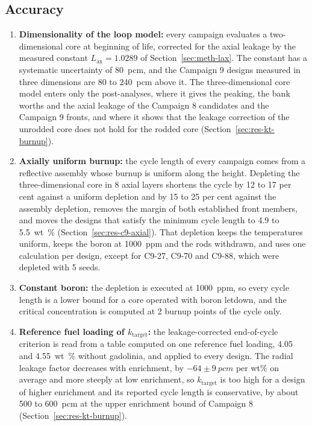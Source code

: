 \subsection{Accuracy}
\label{sec:res-uncertainty-accuracy}

\begin{enumerate}
  \item \textbf{Dimensionality of the loop model:} every campaign
        evaluates a two-dimensional core at beginning of life,
        corrected for the axial leakage by the measured constant
        $L_\mathrm{ax} = 1.0289$ of Section~\ref{sec:meth-lax}. The
        constant has a systematic uncertainty of \SI{80}{pcm}, and the
        Campaign 9 designs measured in three dimensions are 80 to
        \SI{240}{pcm} above it. The three-dimensional core model
        enters only the post-analyses, where it gives the peaking, the
        bank worths and the axial leakage of the Campaign 8 candidates
        and the Campaign 9 fronts, and where it shows that the leakage
        correction of the unrodded core does not hold for the rodded
        core (Section~\ref{sec:res-kt-burnup}).

  \item \textbf{Axially uniform burnup:} the cycle length of every
        campaign comes from a reflective assembly whose burnup is
        uniform along the height. Depleting the three-dimensional core
        in 8 axial layers shortens the cycle by 12 to 17 per cent
        against a uniform depletion and by 15 to 25 per cent against
        the assembly depletion, removes the margin of both established
        front members, and moves the designs that satisfy the minimum
        cycle length to 4.9 to \SI{5.5}{wt\%}
        (Section~\ref{sec:res-c9-axial}). That depletion keeps the
        temperatures uniform, keeps the boron at \SI{1000}{ppm} and the
        rods withdrawn, and uses one calculation per design, except for
        C9-27, C9-70 and C9-88, which were depleted with 5 seeds.

  \item \textbf{Constant boron:} the depletion is executed at
        \SI{1000}{ppm}, so every cycle length is a lower bound for a
        core operated with boron letdown, and the critical concentration
        is computed at 2 burnup points of the cycle only.

  \item \textbf{Reference fuel loading of $k_\mathrm{target}$:} the
        leakage-corrected end-of-cycle criterion is read from a table
        computed on one reference fuel loading, 4.05 and
        \SI{4.55}{wt\%} without gadolinia, and applied to every design.
        The radial leakage factor decreases with enrichment, by
        $-64 \pm \SI{9}{pcm}$ per wt\% on average and more steeply at
        low enrichment, so $k_\mathrm{target}$ is too high for a design
        of higher enrichment and its reported cycle length is
        conservative, by about 500 to \SI{600}{pcm} at the upper
        enrichment bound of Campaign 8 (Section~\ref{sec:res-kt-burnup}).


\end{enumerate}

